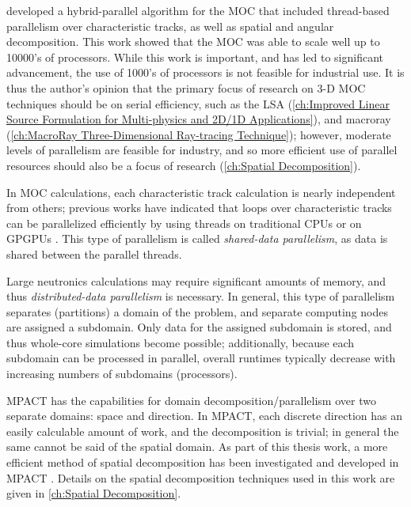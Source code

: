 {{        \citet{Kochunas2013} developed a hybrid-parallel algorithm for the \ac{MOC} that included thread-based parallelism over characteristic tracks, as well as spatial and angular decomposition.
        This work showed that the \ac{MOC} was able to scale well up to 10000's of processors.
        While this work is important, and has led to significant advancement, the use of 1000's of processors is not feasible for industrial use.
        It is thus the author's opinion that the primary focus of research on 3-D \ac{MOC} techniques should be on serial efficiency, such as the \acf{LSA} (\cref{ch:Improved Linear Source Formulation for Multi-physics and 2D/1D Applications}), and macroray (\cref{ch:MacroRay Three-Dimensional Ray-tracing Technique});
        however, moderate levels of parallelism are feasible for industry, and so more efficient use of parallel resources should also be a focus of research (\cref{ch:Spatial Decomposition}).

        In \ac{MOC} calculations, each characteristic track calculation is nearly independent from others; previous works have indicated that loops over characteristic tracks can be parallelized efficiently by using threads on traditional \acp{CPU} \cite{Kochunas2013} or on \acp{GPGPU} \cite{Boyd2014}.
        This type of parallelism is called \emph{shared-data parallelism}, as data is shared between the parallel threads.

        Large neutronics calculations may require significant amounts of memory, and thus \emph{distributed-data parallelism} is necessary.
        In general, this type of parallelism separates (partitions) a domain of the problem, and separate computing nodes are assigned a subdomain.
        Only data for the assigned subdomain is stored, and thus whole-core simulations become possible; additionally, because each subdomain can be processed in parallel, overall runtimes typically decrease with increasing numbers of subdomains (processors).

        MPACT has the capabilities for domain decomposition/parallelism over two separate domains: space and direction.
        In MPACT, each discrete direction has an easily calculable amount of work, and the decomposition is trivial; in general the same cannot be said of the spatial domain.
        As part of this thesis work, a more efficient method of spatial decomposition has been investigated and developed in MPACT \cite{Fitzgerald2019a}.
        Details on the spatial decomposition techniques used in this work are given in \cref{ch:Spatial Decomposition}.
    }

    \printbibliography
}
